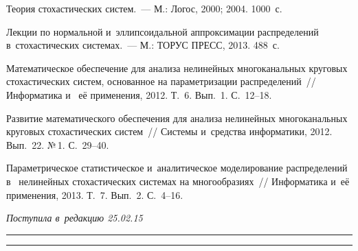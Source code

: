 \begin{multicols}{2}
{{\begin{thebibliography}{99}
Теория стохастических систем.~--- М.: Логос, 2000; 2004. 1000~с.


Лекции по нормальной и~эллипсоидальной аппроксимации распределений в~стохастических системах.~--- М.: ТОРУС ПРЕСС, 2013. 488~с.


Математическое обеспечение для анализа нелинейных многоканальных круговых стохастических систем, основанное на параметризации распределений~// Информатика и~ её применения, 2012. Т.~6. Вып.~1. С.~12--18.


Развитие математического обеспечения для анализа нелинейных многоканальных круговых стохастических систем~// Системы и~средства информатики, 2012. Вып.~22. №\,1. С.~29--40.

Параметрическое статистическое и~аналитическое моделирование распределений в~ нелинейных стохастических системах на многообразиях~// Информатика и~её применения, 2013. Т.~7. Вып.~2. С.~4--16.

 \end{thebibliography}

 }
 }

\end{multicols}

\vspace*{-3pt}

\hfill{\small\textit{Поступила в~редакцию 25.02.15}}


\vspace*{12pt}

\hrule

\vspace*{2pt}

\hrule


\def\tit{MODELING OF~NORMAL PROCESSES IN~STOCHASTIC SYSTEMS WITH~COMPLEX TRANSCENDENTAL  NONLINEARITIES}

\def\titkol{Modeling of~normal processes in~stochastic systems with~complex transcendental  nonlinearities}

\def\aut{I.\,N.~Sinitsyn, V.\,I.~Sinitsyn, and E.\,R.~Korepanov}

